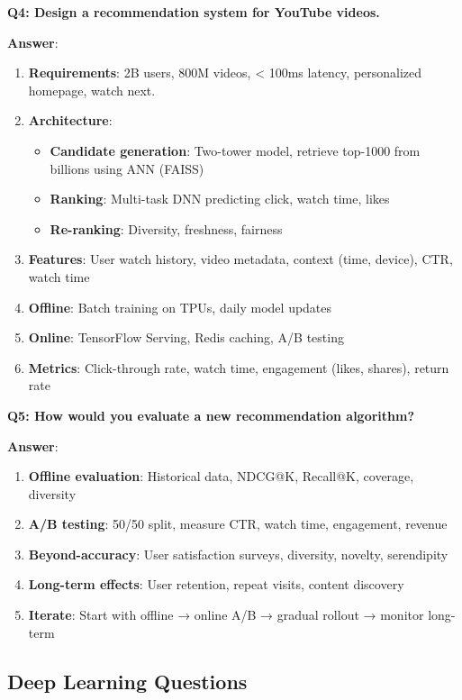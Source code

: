 \documentclass[10pt]{article}
\begin{document}
\textbf{Q4: Design a recommendation system for YouTube videos.}

\textbf{Answer}:
\begin{enumerate}[leftmargin=*]
    \item \textbf{Requirements}: 2B users, 800M videos, < 100ms latency, personalized homepage, watch next.
    \item \textbf{Architecture}:
    \begin{itemize}
        \item \textbf{Candidate generation}: Two-tower model, retrieve top-1000 from billions using ANN (FAISS)
        \item \textbf{Ranking}: Multi-task DNN predicting click, watch time, likes
        \item \textbf{Re-ranking}: Diversity, freshness, fairness
    \end{itemize}
    \item \textbf{Features}: User watch history, video metadata, context (time, device), CTR, watch time
    \item \textbf{Offline}: Batch training on TPUs, daily model updates
    \item \textbf{Online}: TensorFlow Serving, Redis caching, A/B testing
    \item \textbf{Metrics}: Click-through rate, watch time, engagement (likes, shares), return rate
\end{enumerate}

\textbf{Q5: How would you evaluate a new recommendation algorithm?}

\textbf{Answer}:
\begin{enumerate}[leftmargin=*]
    \item \textbf{Offline evaluation}: Historical data, NDCG@K, Recall@K, coverage, diversity
    \item \textbf{A/B testing}: 50/50 split, measure CTR, watch time, engagement, revenue
    \item \textbf{Beyond-accuracy}: User satisfaction surveys, diversity, novelty, serendipity
    \item \textbf{Long-term effects}: User retention, repeat visits, content discovery
    \item \textbf{Iterate}: Start with offline → online A/B → gradual rollout → monitor long-term
\end{enumerate}

\subsection{Deep Learning Questions}
\end{document}
